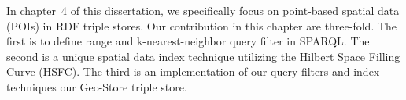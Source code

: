 In chapter~4 of this dissertation, we specifically focus on point-based spatial data (POIs) in RDF triple stores. Our contribution in this chapter are three-fold. The first is to define range and k-nearest-neighbor query filter in SPARQL. The second is a unique spatial data index technique utilizing the Hilbert Space Filling Curve (HSFC). The third is an implementation of our query filters and index techniques our Geo-Store triple store. 
